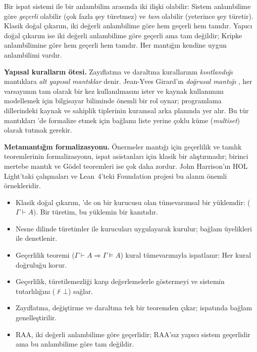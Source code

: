 \begin{onemlifikir}
Bir ispat sistemi ile bir anlambilim arasında iki ilişki olabilir:
Sistem anlambilime göre \emph{geçerli} olabilir (çok fazla şey
türetmez) ve \emph{tam} olabilir (yeterince şey türetir). Klasik doğal
çıkarım, iki değerli anlambilime göre hem geçerli hem tamdır. Yapıcı
doğal çıkarım ise iki değerli anlambilime göre geçerli ama tam
değildir; Kripke anlambilimine göre hem geçerli hem tamdır. Her mantığın
kendine uygun anlambilimi vardır.
\end{onemlifikir}

\begin{arastirmanotu}
\textbf{Yapısal kuralların ötesi.} Zayıflatma ve daraltma kurallarının
\emph{kısıtlandığı} mantıklara \emph{alt yapısal mantıklar} denir.
Jean-Yves Girard'ın \emph{doğrusal mantığı} \citep{girard1987}, her
varsayımın tam olarak bir kez kullanılmasını ister ve kaynak kullanımını
modellemek için bilgisayar biliminde önemli bir rol oynar; programlama
dillerindeki kaynak ve sahiplik tiplerinin kuramsal arka planında yer alır. Bu tür
mantıkları \Lean{}'de formalize etmek için bağlamı liste yerine çoklu
küme (\emph{multiset}) olarak tutmak gerekir.

\textbf{Metamantığın formalizasyonu.} Önermeler mantığı için geçerlilik
ve tamlık teoremlerinin formalizasyonu, ispat asistanları için klasik
bir alıştırmadır; birinci mertebe mantık ve Gödel teoremleri ise çok daha
zordur. John Harrison'ın HOL Light'taki çalışmaları \citep{harrison2009}
ve Lean~4'teki Foundation projesi \citep{foundation, saitou2026} bu
alanın önemli örnekleridir.
\end{arastirmanotu}

\begin{bolumozeti}
\begin{itemize}
  \item Klasik doğal çıkarım, \Lean{}'de on bir kurucusu olan
        tümevarımsal bir yüklemdir:  ($\Gamma \vdash A$).
        Bir türetim, bu yüklemin bir kanıtıdır.
  \item Nesne dilinde türetimler  ile kurucuları
        uygulayarak kurulur; bağlam üyelikleri  ile
        denetlenir.
  \item Geçerlilik teoremi ($\Gamma \vdash A \Rightarrow \Gamma \models A$)
        kural tümevarımıyla ispatlanır: Her kural doğruluğu korur.
  \item Geçerlilik, türetilemezliği karşı değerlemelerle göstermeyi ve
        sistemin tutarlılığını ($\nvdash \bot$) sağlar.
  \item Zayıflatma, değiştirme ve daraltma tek bir teoremden çıkar;
        ispatında bağlam genelleştirilir.
  \item RAA, iki değerli anlambilime göre geçerlidir; RAA'sız yapıcı
        sistem geçerlidir ama bu anlambilime göre tam değildir.
\end{itemize}
\end{bolumozeti}


